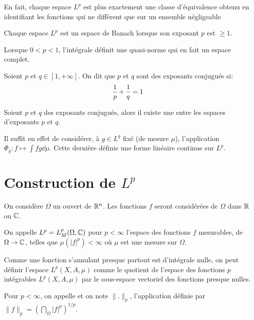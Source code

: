 \medskip
En fait, chaque espace $L^p$ est plus exactement une classe d'équivalence obtenu en
identifiant les fonctions qui ne diffèrent que sur un ensemble négligeable

\medskip
Chaque espace $L^p$ est un espace de Banach lorsque son exposant $p$ est $\ge 1$.

\medskip
Lorsque $0 < p < 1$, l'intégrale définit une quasi-norme qui en fait un espace complet.

\medskip
\begin{definition}
Soient $p$ et $q\in [1,+\infty]$. On dit que $p$ et $q$ sont des exposants conjugués si:
\begin{equation}\colorred\dfrac1p + \dfrac1q = 1 \end{equation}
\end{definition}

\begin{theoreme}
Soient $p$ et $q$ des exposants conjugués, alors il existe une  entre les espaces d'exposants $p$ et $q$.
\end{theoreme}
Il suffit en effet de considérer, à $g\in L^q$ fixé (de mesure $\mu$), l'application $\Phi_g: f\mapsto \int fg\dd\mu$. Cette dernière
définie une forme linéaire continue sur $L^p$.

\medskip
\section{Construction de $L^p$}

On considère $\Omega$ un ouvert de $\mathbb R^n$.
Les fonctions $f$ seront considérées de $\Omega$  dans $\mathbb R$ ou $\mathbb C$.

\medskip
On appelle $\colorblue L^p \colorblack= L^p_M(\Omega,\CC)$ pour $p<\infty$
l'espace des fonctions $f$ mesurables, de $\Omega \rightarrow \mathbb C$, telles que
$\mu(|f|^p)<\infty$ où $\mu$ est une mesure sur $\Omega$.

\medskip
Comme une fonction s'annulant presque partout est d'intégrale nulle, on peut définir
l'espace $L^p(X,A,\mu)$ comme le quotient de l'espace des fonctions $p$ intégrables
$L^p(X,A,\mu)$ par le sous-espace vectoriel des fonctions presque nulles.


\medskip
\begin{definition}[Norme $L^p$]
Pour $p<\infty$, on appelle  et on note $\|.\|_p$,
l'application définie par $\|f\|_p=\left(\dint_\Omega |f|^p\right)^{1/p}$.
\end{definition}

